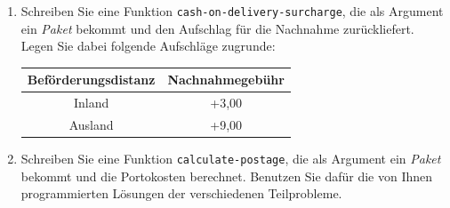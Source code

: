 \begin{aufgabe}
\begin{enumerate}
  \item Schreiben Sie eine Funktion
    \texttt{cash-on-delivery-surcharge}, die als Argument ein
    \textit{Paket} bekommt und den Aufschlag für die Nachnahme
    zurückliefert.  Legen Sie dabei folgende Aufschläge zugrunde:

    \begin{center}
      \begin{tabular}{c|c}
        Beförderungsdistanz & Nachnahmegebühr \\
        \hline
        Inland & +3,00 \\
        Ausland & +9,00 \\
      \end{tabular}
    \end{center}

  \item Schreiben Sie eine Funktion \texttt{calculate-postage}, die
    als Argument ein \textit{Paket} bekommt und die Portokosten
    berechnet.  Benutzen Sie dafür die von Ihnen programmierten
    Lösungen der verschiedenen Teilprobleme.
    
  \end{enumerate}
  
\end{aufgabe}

